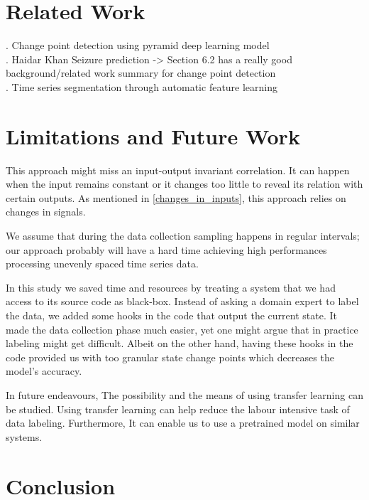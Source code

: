 \section{Related Work}
. Change point detection using pyramid deep learning model \cite{Ebrahimzadeh2019}\\
. Haidar Khan \cite{Khan2019thesis} Seizure prediction \cite{khan2017focal} -> Section 6.2 has a really good background/related work summary for change point detection \cite{khan2019deep}  \\
. Time series segmentation through automatic feature learning \cite{Lee2018TimeSeriesSegmentation}\\


\section{Limitations and Future Work}
This approach might miss an input-output invariant correlation. It can happen when the input remains constant or it changes too little to reveal its relation with certain outputs. As mentioned in \ref{changes_in_inputs}, this approach relies on changes in signals.

We assume that during the data collection sampling happens in regular intervals; our approach probably will have a hard time achieving high performances processing unevenly spaced time series data.

In this study we saved time and resources by treating a system that we had access to its source code as black-box. Instead of asking a domain expert to label the data, we added some hooks in the code that output the current state. It made the data collection phase much easier, yet one might argue that in practice labeling might get difficult. Albeit on the other hand, having these hooks in the code provided us with too granular state change points which decreases the model's accuracy.

In future endeavours, The possibility and the means of using transfer learning can be studied. Using transfer learning can help reduce the labour intensive task of data labeling. Furthermore, It can enable us to use a pretrained model on similar systems.


\section{Conclusion}
